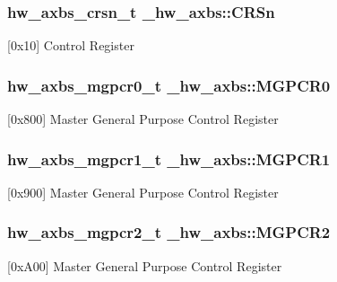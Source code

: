 \subsubsection[{\texorpdfstring{C\+R\+Sn}{CRSn}}]{ {\bf hw\+\_\+axbs\+\_\+crsn\+\_\+t} \+\_\+hw\+\_\+axbs\+::\+C\+R\+Sn}\hypertarget{struct__hw__axbs_a79216f59c8d8bf2684b750138ccb4d42}{}\label{struct__hw__axbs_a79216f59c8d8bf2684b750138ccb4d42}
\mbox{[}0x10\mbox{]} Control Register 
\subsubsection[{\texorpdfstring{M\+G\+P\+C\+R0}{MGPCR0}}]{ {\bf hw\+\_\+axbs\+\_\+mgpcr0\+\_\+t} \+\_\+hw\+\_\+axbs\+::\+M\+G\+P\+C\+R0}\hypertarget{struct__hw__axbs_aaa24f09bac94facdf4f69323e52625a6}{}\label{struct__hw__axbs_aaa24f09bac94facdf4f69323e52625a6}
\mbox{[}0x800\mbox{]} Master General Purpose Control Register 
\subsubsection[{\texorpdfstring{M\+G\+P\+C\+R1}{MGPCR1}}]{ {\bf hw\+\_\+axbs\+\_\+mgpcr1\+\_\+t} \+\_\+hw\+\_\+axbs\+::\+M\+G\+P\+C\+R1}\hypertarget{struct__hw__axbs_a4bbd821ae50de05c8f9dd5c7b5091376}{}\label{struct__hw__axbs_a4bbd821ae50de05c8f9dd5c7b5091376}
\mbox{[}0x900\mbox{]} Master General Purpose Control Register 
\subsubsection[{\texorpdfstring{M\+G\+P\+C\+R2}{MGPCR2}}]{ {\bf hw\+\_\+axbs\+\_\+mgpcr2\+\_\+t} \+\_\+hw\+\_\+axbs\+::\+M\+G\+P\+C\+R2}\hypertarget{struct__hw__axbs_a3e2342e65da875aebfecd5e8bf869848}{}\label{struct__hw__axbs_a3e2342e65da875aebfecd5e8bf869848}
\mbox{[}0x\+A00\mbox{]} Master General Purpose Control Register 
